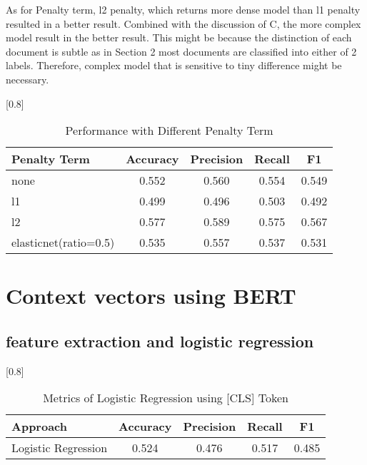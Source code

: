\documentclass[a4paper,11pt]{article}
\begin{document}
As for Penalty term, l2 penalty, which returns more dense model than l1 penalty resulted in a better result.
Combined with the discussion of C, the more complex model result in the better result.
This might be because the distinction of each document is subtle as in Section 2 most documents are classified into either of 2 labels.
Therefore, complex model that is sensitive to tiny difference might be necessary.




\begin{table}[htbp]
    \centering
    \caption{Performance with Different Penalty Term}
    \small
    \scalebox{0.8}[0.8]{
    \begin{tabular}{l|cccc}
        Penalty Term & Accuracy & Precision & Recall & F1 \\ \hline 
        none & 0.552 & 0.560 & 0.554 & 0.549 \\ 
        l1 & 0.499 & 0.496 & 0.503 & 0.492 \\
        \rowcolor[rgb]{0.9,0.9,0}l2 & 0.577 & 0.589 & 0.575 & 0.567 \\
        elasticnet(ratio=0.5) & 0.535 & 0.557 & 0.537 & 0.531 \\



    \end{tabular}

    }
\end{table}

\section{Context vectors using BERT}

\subsection{feature extraction and logistic regression}

\begin{table}[htbp]
    \centering
    \caption{Metrics of Logistic Regression using [CLS] Token}
    \small
    \scalebox{0.8}[0.8]{
    \begin{tabular}{l|cccc}
         Approach & Accuracy & Precision & Recall & F1 \\ \hline 
         Logistic Regression & 0.524 & 0.476 & 0.517 & 0.485 \\ 

    \end{tabular}

    }
\end{table}
\end{document}
